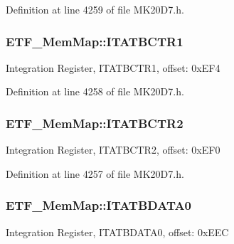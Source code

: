 Definition at line 4259 of file M\+K20\+D7.\+h.

\subsubsection[{\texorpdfstring{I\+T\+A\+T\+B\+C\+T\+R1}{ITATBCTR1}}]{ E\+T\+F\+\_\+\+Mem\+Map\+::\+I\+T\+A\+T\+B\+C\+T\+R1}\hypertarget{struct_e_t_f___mem_map_a43cd2057b8fcb847375a18e4638f923e}{}\label{struct_e_t_f___mem_map_a43cd2057b8fcb847375a18e4638f923e}
Integration Register, I\+T\+A\+T\+B\+C\+T\+R1, offset\+: 0x\+E\+F4 

Definition at line 4258 of file M\+K20\+D7.\+h.

\subsubsection[{\texorpdfstring{I\+T\+A\+T\+B\+C\+T\+R2}{ITATBCTR2}}]{ E\+T\+F\+\_\+\+Mem\+Map\+::\+I\+T\+A\+T\+B\+C\+T\+R2}\hypertarget{struct_e_t_f___mem_map_ab6920fa131f508ff5a9b6817be95bed5}{}\label{struct_e_t_f___mem_map_ab6920fa131f508ff5a9b6817be95bed5}
Integration Register, I\+T\+A\+T\+B\+C\+T\+R2, offset\+: 0x\+E\+F0 

Definition at line 4257 of file M\+K20\+D7.\+h.

\subsubsection[{\texorpdfstring{I\+T\+A\+T\+B\+D\+A\+T\+A0}{ITATBDATA0}}]{ E\+T\+F\+\_\+\+Mem\+Map\+::\+I\+T\+A\+T\+B\+D\+A\+T\+A0}\hypertarget{struct_e_t_f___mem_map_ab9991b5782efe3ff465d49f40ed0bbfa}{}\label{struct_e_t_f___mem_map_ab9991b5782efe3ff465d49f40ed0bbfa}
Integration Register, I\+T\+A\+T\+B\+D\+A\+T\+A0, offset\+: 0x\+E\+EC 

